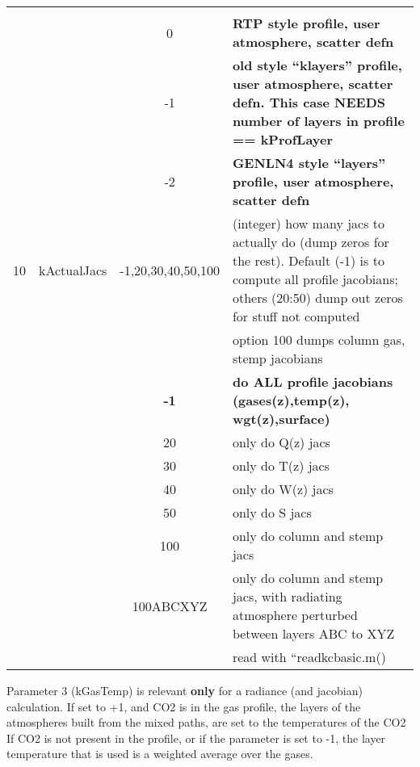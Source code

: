 \documentclass[12pt]{article}
\newlength{\colwidth}
\newlength{\colwidthshort}
\begin{document}
\begin{small}
\begin{longtable}{|c|c|c|p{\colwidthshort}|}
{{                                scatter defn}\\
  &              & {0}       & {\bf RTP style profile, user atmosphere, 
                                scatter defn}\\
  &              & {-1}      & {\bf old style ``klayers'' profile, user 
                                 atmosphere, scatter defn. This case NEEDS 
                                 number of layers in profile == kProfLayer }\\
  &              & {-2}      & {\bf GENLN4 style ``layers'' profile, user 
                                 atmosphere, scatter defn}\\ \hline
10 & {\sf kActualJacs}  & -1,20,30,40,50,100  & (integer) how many jacs to 
  actually do (dump zeros for the rest). Default (-1) is to compute all 
  profile jacobians; others (20:50) dump out zeros for stuff not computed\\
  &              &           & option 100 dumps column gas, stemp jacobians \\
  &              & {\bf -1}  &{\bf do ALL profile jacobians (gases(z),temp(z),
                               wgt(z),surface)}\\
  &              & {20}        & only do Q(z) jacs\\
  &              & {30}        & only do T(z) jacs\\
  &              & {40}        & only do W(z) jacs\\
  &              & {50}        & only do S jacs\\   
  &              & {100}       & only do column and stemp jacs\\
  &              & {100ABCXYZ} & only do column and stemp jacs, with 
                   radiating atmosphere perturbed between layers ABC to XYZ\\
  &              &             &  read with ``readkcbasic.m()\\   \hline
  \hline
\end{longtable}
\end{small}

Parameter 3 ({\sf kGasTemp}) is relevant {\bf only} for a radiance
(and jacobian) calculation.  If set to +1, and CO2 is in the gas
profile, the layers of the atmospheres built from the mixed paths, are
set to the temperatures of the CO2 If CO2 is not present in the
profile, or if the parameter is set to -1, the layer temperature that
is used is a weighted average over the gases.
\end{document}
